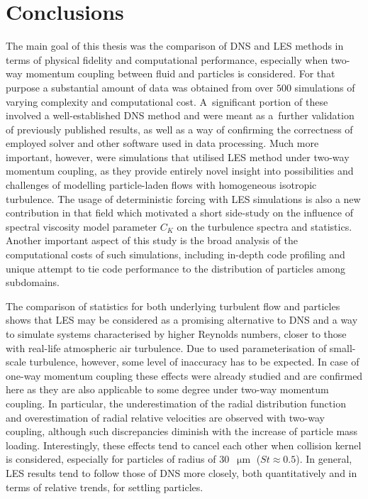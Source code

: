 \documentclass{pracamgren}
\begin{document}
\chapter*{Conclusions}
\label{ch:end}

The main goal of this thesis was the comparison of DNS and LES methods in terms of physical fidelity and computational performance, especially when two-way momentum coupling between fluid and particles is considered.
For that purpose a substantial amount of data was obtained from over $500$ simulations of varying complexity and computational cost.
A~significant portion of these involved a well-established DNS method and were meant as a~further validation of previously published results, as well as a way of confirming the correctness of employed solver and other software used in data processing.
Much more important, however, were simulations that utilised LES method under two-way momentum coupling, as they provide entirely novel insight into possibilities and challenges of modelling particle-laden flows with homogeneous isotropic turbulence.
The usage of deterministic forcing with LES simulations is also a new contribution in that field which motivated a short side-study on the influence of spectral viscosity model parameter $C_K$ on the turbulence spectra and statistics.
Another important aspect of this study is the broad analysis of the computational costs of such simulations, including in-depth code profiling and unique attempt to tie code performance to the distribution of particles among subdomains.

The comparison of statistics for both underlying turbulent flow and particles  shows that LES may be considered as a promising alternative to DNS and a way to simulate systems characterised by higher Reynolds numbers, closer to those with real-life atmospheric air turbulence.
Due to used parameterisation of small-scale turbulence, however, some level of inaccuracy has to be expected.
In case of one-way momentum coupling these effects were already studied and are confirmed here as they are also applicable to some degree under two-way momentum coupling.
In particular, the underestimation of the radial distribution function and overestimation of radial relative velocities are observed with two-way coupling, although such discrepancies diminish with the increase of particle mass loading.
Interestingly, these effects tend to cancel each other when collision kernel is considered, especially for particles of radius of $30$~$\upmu\text{m}$ ($St \approx 0.5$).
In general, LES results tend to follow those of DNS more closely, both quantitatively and in terms of relative trends, for settling particles.
\end{document}
